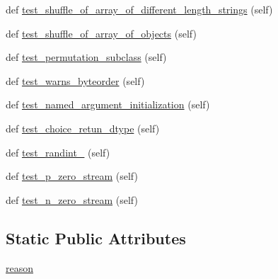 \begin{DoxyCompactItemize}
\item 
def \hyperlink{classnumpy_1_1random_1_1tests_1_1test__randomstate__regression_1_1TestRegression_af2f2cc3bc7aaead015263df019dc5e5d}{test\+\_\+shuffle\+\_\+of\+\_\+array\+\_\+of\+\_\+different\+\_\+length\+\_\+strings} (self)
\item 
def \hyperlink{classnumpy_1_1random_1_1tests_1_1test__randomstate__regression_1_1TestRegression_a0245f87645b56892ab3cb377974c127e}{test\+\_\+shuffle\+\_\+of\+\_\+array\+\_\+of\+\_\+objects} (self)
\item 
def \hyperlink{classnumpy_1_1random_1_1tests_1_1test__randomstate__regression_1_1TestRegression_a82513b849f54fbdf60eb37cff747ca2d}{test\+\_\+permutation\+\_\+subclass} (self)
\item 
def \hyperlink{classnumpy_1_1random_1_1tests_1_1test__randomstate__regression_1_1TestRegression_a6502734274bf0aafd0368fe8fd66a9ee}{test\+\_\+warns\+\_\+byteorder} (self)
\item 
def \hyperlink{classnumpy_1_1random_1_1tests_1_1test__randomstate__regression_1_1TestRegression_a7f278e84790e399227b25004eaa7aafd}{test\+\_\+named\+\_\+argument\+\_\+initialization} (self)
\item 
def \hyperlink{classnumpy_1_1random_1_1tests_1_1test__randomstate__regression_1_1TestRegression_aa9a1545093783aff03020e10f4cb6561}{test\+\_\+choice\+\_\+retun\+\_\+dtype} (self)
\item 
def \hyperlink{classnumpy_1_1random_1_1tests_1_1test__randomstate__regression_1_1TestRegression_a5db2f841883c99372f7bdfd062c9d698}{test\+\_\+randint\+\_} (self)
\item 
def \hyperlink{classnumpy_1_1random_1_1tests_1_1test__randomstate__regression_1_1TestRegression_ab0b48a17cdd19b7a08ed9937a95410d6}{test\+\_\+p\+\_\+zero\+\_\+stream} (self)
\item 
def \hyperlink{classnumpy_1_1random_1_1tests_1_1test__randomstate__regression_1_1TestRegression_a70747316820debeb315ef018c2360a1e}{test\+\_\+n\+\_\+zero\+\_\+stream} (self)
\end{DoxyCompactItemize}
\subsection*{Static Public Attributes}
\begin{DoxyCompactItemize}
\item 
\hyperlink{classnumpy_1_1random_1_1tests_1_1test__randomstate__regression_1_1TestRegression_a75c7dd115fee86aee42670c2d6eddd18}{reason}
\end{DoxyCompactItemize}



